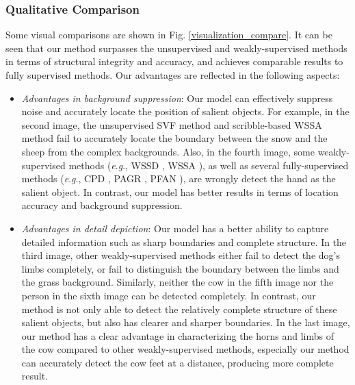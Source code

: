 \documentclass[journal]{IEEEtran}
\newcommand{\eg}{\textit{e}.\textit{g}.}
\begin{document}
\subsubsection{Qualitative Comparison} Some visual comparisons are shown in Fig. \ref{visualization_compare}. It can be seen that our method surpasses the unsupervised and weakly-supervised methods in terms of structural integrity and accuracy, and achieves comparable results to fully supervised methods. Our advantages are reflected in the following aspects:
\begin{itemize}
    \item \emph{Advantages in background suppression}: Our model can effectively suppress noise and accurately locate the position of salient objects. For example, in the second image, the unsupervised SVF method \cite{zhang2017supervision} and scribble-based WSSA method \cite{zhang2020weakly} fail to accurately locate the boundary between the snow and the sheep from the complex backgrounds. Also, in the fourth image,
   some weakly-supervised methods (\eg, WSSD \cite{DBLP:journals/tcsv/ZhengTZML21}, WSSA \cite{zhang2020weakly}), as well as several fully-supervised methods (\eg, CPD \cite{wu2019cascaded}, PAGR \cite{zhang2018progressive}, PFAN \cite{DBLP:conf/cvpr/ZhaoW19}), are wrongly detect the hand as the salient object. In contrast, our model has better results in terms of location accuracy and background suppression.

    \item \emph{Advantages in detail depiction}: Our model has a better ability to capture detailed information such as sharp boundaries and complete structure.
    In the third image, other weakly-supervised methods either fail to detect the dog's limbs completely, or fail to distinguish the boundary between the limbs and the grass background.
    Similarly, neither the cow in the fifth image nor the person in the sixth image can be detected completely.
    In contrast, our method is not only able to detect the relatively complete structure of these salient objects, but also has clearer and sharper boundaries.
    In the last image, our method has a clear advantage in characterizing the horns and limbs of the cow compared to other weakly-supervised methods, especially our method can accurately detect the cow feet at a distance, producing more complete result.



\end{itemize}
\end{document}
